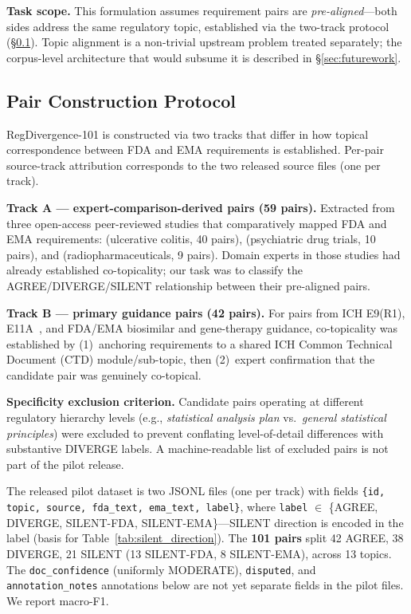 \documentclass[manuscript]{acmart}
\begin{document}
\textbf{Task scope.} This formulation assumes requirement pairs are
\textit{pre-aligned}---both sides address the same regulatory topic, established
via the two-track protocol (\S\ref{sec:dataset}). Topic alignment is a
non-trivial upstream problem treated separately; the corpus-level architecture
that would subsume it is described in \S\ref{sec:futurework}.

\subsection{Pair Construction Protocol}
\label{sec:dataset}

RegDivergence-101 is constructed via two tracks that differ in how topical
correspondence between FDA and EMA requirements is established. Per-pair
source-track attribution corresponds to the two released source files (one per track).

\textbf{Track A --- expert-comparison-derived pairs (59 pairs).}
Extracted from three open-access peer-reviewed studies that comparatively mapped
FDA and EMA requirements: \citet{uc2025jcc} (ulcerative colitis, 40 pairs),
\citet{pmc8157504} (psychiatric drug trials, 10 pairs), and
\citet{pmc6529498} (radiopharmaceuticals, 9 pairs). Domain experts in those
studies had already established co-topicality; our task was to classify the
AGREE/DIVERGE/SILENT relationship between their pre-aligned pairs.

\textbf{Track B --- primary guidance pairs (42 pairs).}
For pairs from ICH E9(R1), E11A~\cite{iche11a2024}, and FDA/EMA biosimilar and
gene-therapy guidance, co-topicality was established by (1)~anchoring
requirements to a shared ICH Common Technical Document (CTD) module/sub-topic,
then (2)~expert confirmation that the candidate pair was genuinely co-topical.

\textbf{Specificity exclusion criterion.}
Candidate pairs operating at different regulatory hierarchy levels (e.g.,
\textit{statistical analysis plan} vs.\ \textit{general statistical principles})
were excluded to prevent conflating level-of-detail differences with substantive
DIVERGE labels. A machine-readable list of excluded pairs is not part of the pilot release.

The released pilot dataset is two JSONL files (one per track) with fields
\texttt{\{id, topic, source, fda\_text, ema\_text, label\}}, where
\texttt{label} $\in$ \{AGREE, DIVERGE, SILENT-FDA, SILENT-EMA\}---SILENT
direction is encoded in the label (basis for Table~\ref{tab:silent_direction}).
The \textbf{101 pairs} split 42 AGREE, 38 DIVERGE, 21 SILENT (13 SILENT-FDA,
8 SILENT-EMA), across 13 topics. The \texttt{doc\_confidence} (uniformly
MODERATE), \texttt{disputed}, and \texttt{annotation\_notes} annotations below
are not yet separate fields in the pilot files. We report macro-F1.
\end{document}
